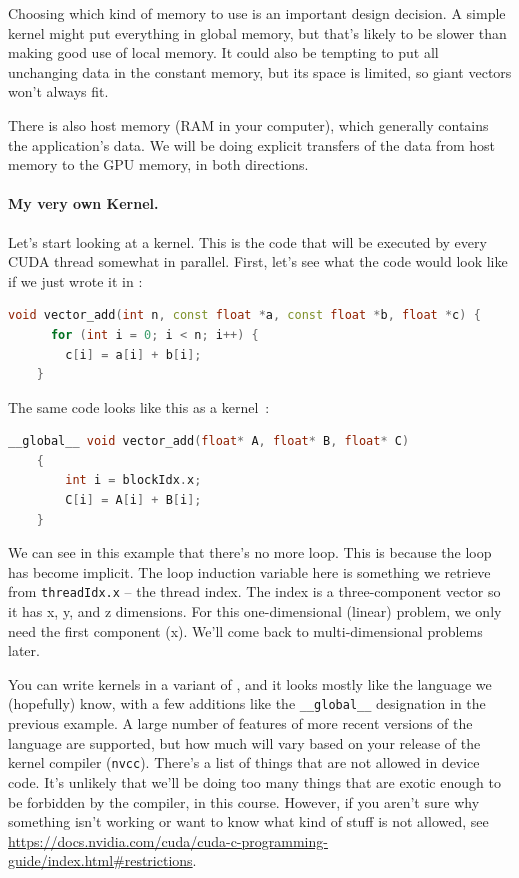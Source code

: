 Choosing which kind of memory to use is an important design decision. A simple kernel might put everything in global memory, but that's likely to be slower than making good use of local memory. It could also be tempting to put all unchanging data in the constant memory, but its space is limited, so giant vectors won't always fit.

There is also host memory (RAM in your computer), which generally contains the application's data. We will be doing explicit transfers of the data from host memory to the GPU memory, in both directions.

\paragraph{My very own Kernel.} Let's start looking at a kernel. This is the code that will be executed by every CUDA thread somewhat in parallel. First, let's see what the code would look like if we just wrote it in \CPP:

\begin{lstlisting}[language=C++]
    void vector_add(int n, const float *a, const float *b, float *c) {
      for (int i = 0; i < n; i++) {
        c[i] = a[i] + b[i];
    }
\end{lstlisting}


The same code looks like this as a kernel~\cite{cuda}:
\begin{lstlisting}[language=C++]
    __global__ void vector_add(float* A, float* B, float* C)
    {
        int i = blockIdx.x;
        C[i] = A[i] + B[i];
    }
\end{lstlisting}

We can see in this example that there's no more loop. This is because the loop has become implicit. The loop induction variable here is something we retrieve from \texttt{threadIdx.x} -- the thread index. The index is a three-component vector so it has x, y, and z dimensions. For this one-dimensional (linear) problem, we only need the first component (x). We'll come back to multi-dimensional problems later.

You can write kernels in a variant of \CPP, and it looks mostly like the language we (hopefully) know, with a few additions like the \texttt{\_\_global\_\_} designation in the previous example. A large number of features of more recent versions of the language are supported, but how much will vary based on your release of the kernel compiler (\texttt{nvcc}). There's a list of things that are not allowed in device code. It's unlikely that we'll be doing too many things that are exotic enough to be forbidden by the compiler, in this course. However, if you aren't sure why something isn't working or want to know what kind of stuff is not allowed, see \url{https://docs.nvidia.com/cuda/cuda-c-programming-guide/index.html#restrictions}. 

